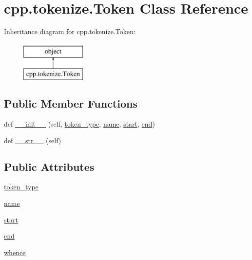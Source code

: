 \hypertarget{classcpp_1_1tokenize_1_1Token}{}\section{cpp.\+tokenize.\+Token Class Reference}
\label{classcpp_1_1tokenize_1_1Token}
Inheritance diagram for cpp.\+tokenize.\+Token\+:\begin{figure}[H]
\begin{center}
\leavevmode
\includegraphics[height=2.000000cm]{classcpp_1_1tokenize_1_1Token}
\end{center}
\end{figure}
\subsection*{Public Member Functions}
\begin{DoxyCompactItemize}
\item 
def \mbox{\hyperlink{classcpp_1_1tokenize_1_1Token_a7da7659a5a6c61d0f4b8590cf96e19fd}{\+\_\+\+\_\+init\+\_\+\+\_\+}} (self, \mbox{\hyperlink{classcpp_1_1tokenize_1_1Token_a60c6e5120f3947885f10788ceb69a660}{token\+\_\+type}}, \mbox{\hyperlink{classcpp_1_1tokenize_1_1Token_a90859dd16bde71bc38f717f5119e63b9}{name}}, \mbox{\hyperlink{classcpp_1_1tokenize_1_1Token_a8ec48e348ff29901857cb21553da464b}{start}}, \mbox{\hyperlink{classcpp_1_1tokenize_1_1Token_a9935738c382352eca19834c2533715db}{end}})
\item 
def \mbox{\hyperlink{classcpp_1_1tokenize_1_1Token_a98e024051039637a18601fcbb0232cc2}{\+\_\+\+\_\+str\+\_\+\+\_\+}} (self)
\end{DoxyCompactItemize}
\subsection*{Public Attributes}
\begin{DoxyCompactItemize}
\item 
\mbox{\hyperlink{classcpp_1_1tokenize_1_1Token_a60c6e5120f3947885f10788ceb69a660}{token\+\_\+type}}
\item 
\mbox{\hyperlink{classcpp_1_1tokenize_1_1Token_a90859dd16bde71bc38f717f5119e63b9}{name}}
\item 
\mbox{\hyperlink{classcpp_1_1tokenize_1_1Token_a8ec48e348ff29901857cb21553da464b}{start}}
\item 
\mbox{\hyperlink{classcpp_1_1tokenize_1_1Token_a9935738c382352eca19834c2533715db}{end}}
\item 
\mbox{\hyperlink{classcpp_1_1tokenize_1_1Token_a9d3a8011707ede6be85987d74f88848d}{whence}}
\end{DoxyCompactItemize}


